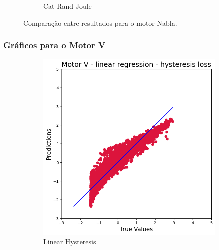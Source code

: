 \documentclass{article}
\begin{document}
\begin{figure}[!htbp]
\begin{subfigure}[b]{0.23\textwidth}
        \caption{Cat Rand Joule}
    \end{subfigure}
    \hfill
    \begin{subfigure}[b]{0.23\textwidth}
        \centering
        \null
    \end{subfigure}
    
    \caption{Comparação entre resultados para o motor Nabla.}
\end{figure}

\newpage

\subsubsection{Gráficos para o Motor V}

\begin{figure}[!htbp]
    \centering
    \begin{subfigure}[b]{0.23\textwidth}
        \centering
        \includegraphics[width=\textwidth]{images/V/linear_hysteresis.png}
        \caption{Linear Hysteresis}
    \end{subfigure}
    \hfill
    \begin{subfigure}[b]{0.23\textwidth}
        \centering

\end{subfigure}
\end{figure}
\end{document}
